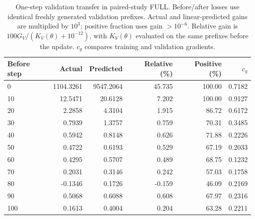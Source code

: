 \begin{table}[!htbp]
\centering
\caption{One-step validation transfer in paired-study FULL. Before/after losses use identical freshly generated validation prefixes. Actual and linear-predicted gains are multiplied by $10^3$; positive fraction uses gain $>10^{-6}$. Relative gain is $100G_V/(K_V(\theta)+10^{-12})$, with $K_V(\theta)$ evaluated on the same prefixes before the update. $c_g$ compares training and validation gradients.}
\label{tab:paired_transfer}
\small
\setlength{\tabcolsep}{3pt}
\begin{tabular}{lrrrrr}
\toprule
Before step  &  Actual  &  Predicted  &  Relative (\%)  &  Positive (\%)  &  $c_g$  \\
\midrule
0  &  1104.3261  &  9547.2064  &  45.735  &  100.00  &  0.7182  \\
10  &  12.5471  &  20.6128  &  7.202  &  100.00  &  0.9127  \\
20  &  2.2858  &  4.3104  &  1.915  &  86.72  &  0.6172  \\
30  &  0.7939  &  1.3757  &  0.759  &  70.31  &  0.3485  \\
40  &  0.5942  &  0.8148  &  0.626  &  71.88  &  0.2226  \\
50  &  0.4722  &  0.6193  &  0.529  &  67.19  &  0.2033  \\
60  &  0.4295  &  0.5707  &  0.489  &  68.75  &  0.1232  \\
70  &  0.2031  &  0.3146  &  0.242  &  57.03  &  0.1758  \\
80  &  -0.1346  &  0.1726  &  -0.159  &  46.09  &  0.2169  \\
90  &  0.5068  &  0.6088  &  0.608  &  67.97  &  0.2316  \\
100  &  0.1613  &  0.4004  &  0.204  &  63.28  &  0.2211  \\
\bottomrule
\end{tabular}
\end{table}
